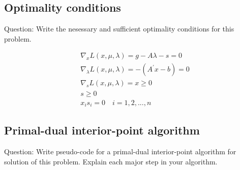 \newpage
\subsection{\bfseries Optimality conditions}
\begin{shaded}
{Question: Write the nesessary and sufficient optimality conditions for this problem.}
\end{shaded}
\begin{align*}
& \nabla_{x} L\left(x,\mu,\lambda\right)=g-A\lambda-s=0\tag{4.3}\\
& \nabla_{\lambda} L\left(x,\mu,\lambda\right)=-\left(A^{\prime}x-b\right)=0\tag{4.4}\\
& \nabla_{s} L\left(x,\mu,\lambda\right)=x \ge 0\tag{4.5}\\
& s \ge 0\tag{4.6}\\
& x_is_i=0 \quad i=1,2,...,n\tag{4.7}
\end{align*}

\subsection{\bfseries Primal-dual interior-point algorithm}
\begin{shaded}
{Question: Write pseudo-code for a primal-dual interior-point algorithm for solution of this
problem. Explain each major step in your algorithm.}
\end{shaded}

